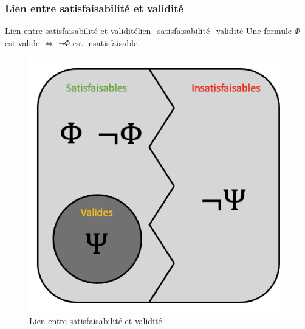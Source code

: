 \documentclass[a4paper, 12pt]{extarticle}
\begin{document}
\subsubsection{Lien entre satisfaisabilité et validité}
\begin{theorem}{Lien entre satisfaisabilité et validité}{lien_satisfaisabilité_validité}
  Une formule $\Phi$ est valide $\Leftrightarrow$ $\neg\Phi$ est insatisfaisable.
\end{theorem}
\begin{figure}[H]
  \centering
  \includegraphics[scale=0.3]{pictures/satisf:vali.png}
  \caption{Lien entre satisfaisabilité et validité}
\end{figure}
\end{document}
